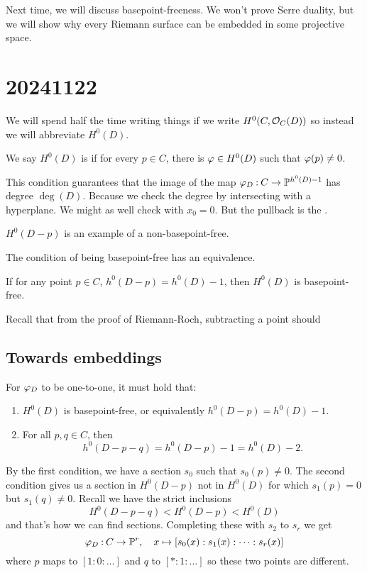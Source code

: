 \documentclass[12pt]{memoir}
\begin{document}
Next time, we will discuss basepoint-freeness. We won't prove Serre duality, but we will show why every Riemann surface can be embedded in some projective space.

\section{20241122}

We will spend half the time writing things if we write $H^0(C,\mathcal{O}_C(D))$ so instead we will abbreviate $H^0(D)$.

\begin{Def}
    We say $H^0(D)$ is  if for every $p\in C$, there is $\varphi\in  H^0(D)$ such that $\varphi(p)\neq 0$.
\end{Def}

This condition guarantees that the image of the map $\varphi_D\mathbin{:} C\to\mathbb{P}^{h^0(D)-1}$ has degree $\deg(D)$. Because we check the degree by intersecting with a hyperplane. We might as well check with $x_0=0$. But the pullback is the .

\begin{Ex}
    $H^0(D-p)$ is an example of a non-basepoint-free. 
\end{Ex}

The condition of being basepoint-free has an equivalence.

\begin{Prop}
    If for any point $p\in C$, $h^0(D-p)=h^0(D)-1$, then $H^0(D)$ is basepoint-free.
\end{Prop}

Recall that from the proof of Riemann-Roch, subtracting a point should 

\subsection{Towards embeddings}

\begin{Prop}
    For $\varphi_D$ to be one-to-one, it must hold that:
    \begin{enumerate}
        \item $H^0(D)$ is basepoint-free, or equivalently $h^0(D-p)=h^0(D)-1$.
        \item For all $p,q\in C$, then 
        $$h^0(D-p-q)=h^0(D-p)-1=h^0(D)-2.$$
    \end{enumerate}
\end{Prop}

\begin{ptcbp}
    By the first condition, we have a section $s_0$ such that $s_0(p)\neq 0$. The second condition gives us a section in $H^0(D-p)$ not in $H^0(D)$ for which $s_1(p)=0$ but $s_1(q)\neq 0$. Recall we have the strict inclusions 
    $$H^0(D-p-q)<H^0(D-p)<H^0(D)$$
    and that's how we can find sections. Completing these with $s_2$ to $s_r$ we get 
    $$\varphi_D\mathbin{:} C\to\mathbb{P}^r,\quad x\mapsto[s_0(x):s_1(x):\dots:s_r(x)]$$
    where $p$ maps to $[1:0:\dots]$ and $q$ to $[\ast:1:\dots]$ so these two points are different.
\end{ptcbp}
\end{document}
